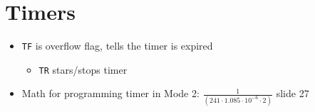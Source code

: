 \documentclass[12pt]{article}
\begin{document}
\section{Timers}
\begin{itemize}
    \item \texttt{TF} is overflow flag, tells the timer is expired
    \begin{itemize}
        \item \texttt{TR} stars/stops timer
    \end{itemize}
    \item Math for programming timer in Mode 2: $\frac{1}{(241\cdot1.085\cdot10^{-6}\cdot2)}$
    slide 27
\end{itemize}
\end{document}
